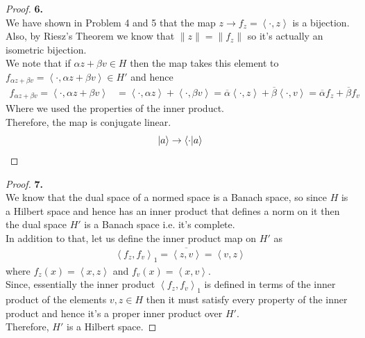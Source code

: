 \documentclass[11pt]{article}
\newcommand{\inprd}[1]{\left\langle{#1}\right\rangle}
\theoremstyle{definition}
\begin{document}
\cleardoublepage
\begin{proof}{\textbf{6.}}\\
We have shown in Problem 4 and 5 that the map $z \to f_z =\inprd{\cdot, z}$ is
a bijection. Also, by Riesz's Theorem we know that $\|z\| = \|f_z\|$ so
it's actually an isometric bijection.\\
We note that if $\alpha z + \beta v \in H$ then the map takes this element to
$f_{\alpha z + \beta v} = \inprd{\cdot, \alpha z + \beta v} \in H'$ and hence
\begin{align*}
    f_{\alpha z + \beta v}
    = \inprd{\cdot, \alpha z + \beta v}
    &= \inprd{\cdot, \alpha z} + \inprd{\cdot, \beta v}
    = \overline{\alpha}\inprd{\cdot, z} + \overline{\beta}\inprd{\cdot, v}
    = \overline{\alpha}f_z + \overline{\beta}f_{v}
\end{align*}
Where we used the properties of the inner product.\\
Therefore, the map is conjugate linear.
$$\ket{a} \to \braket{\cdot}{a}$$
\end{proof}

\cleardoublepage
\begin{proof}{\textbf{7.}}\\
We know that the dual space of a normed space is a Banach space, so since $H$
is a Hilbert space and hence has an inner product that defines a norm on it
then the dual space $H'$ is a Banach space i.e. it's complete.\\
In addition to that, let us define the inner product map on $H'$ as
\begin{align*}
    \inprd{f_z, f_v}_1 = \overline{\inprd{z,v}} = \inprd{v,z}
\end{align*}
where $f_z(x) = \inprd{x,z}$ and $f_v(x) = \inprd{x,v}$.\\
Since, essentially the inner product $\inprd{f_z, f_v}_1$ is defined in terms 
of the inner product of the elements $v,z \in H$ then it must satisfy every
property of the inner product and hence it's a proper inner product over $H'$.\\
Therefore, $H'$ is a Hilbert space.
\end{proof}
\end{document}
